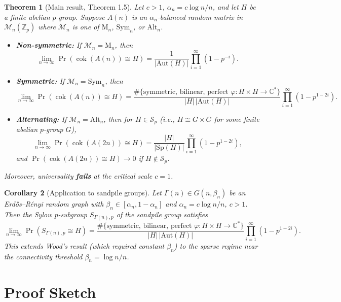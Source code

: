 \documentclass[11pt,a4paper]{article}
\newtheorem{theorem}{Theorem}
\newtheorem{corollary}[theorem]{Corollary}
\begin{document}
\begin{theorem}[Main result, Theorem 1.5]
Let $c > 1$, $\alpha_n = c\log n / n$, and let $H$ be a finite abelian $p$-group. Suppose $A(n)$ is an $\alpha_n$-balanced random matrix in $\mathcal{M}_n(\mathbb{Z}_p)$ where $\mathcal{M}_n$ is one of $\mathrm{M}_n$, $\mathrm{Sym}_n$, or $\mathrm{Alt}_n$.
\begin{itemize}
    \item \textbf{Non-symmetric:} If $\mathcal{M}_n = \mathrm{M}_n$, then
    \[
    \lim_{n\to\infty} \Pr(\operatorname{cok}(A(n)) \cong H) = \frac{1}{|\mathrm{Aut}(H)|}\prod_{i=1}^\infty (1-p^{-i}).
    \]
    \item \textbf{Symmetric:} If $\mathcal{M}_n = \mathrm{Sym}_n$, then
    \[
    \lim_{n\to\infty} \Pr(\operatorname{cok}(A(n)) \cong H) = \frac{\#\{\text{symmetric, bilinear, perfect } \varphi\colon H\times H \to \mathbb{C}^*\}}{|H|\,|\mathrm{Aut}(H)|}\prod_{i=1}^\infty (1-p^{1-2i}).
    \]
    \item \textbf{Alternating:} If $\mathcal{M}_n = \mathrm{Alt}_n$, then for $H \in \mathcal{S}_p$ (i.e., $H \cong G\times G$ for some finite abelian $p$-group $G$),
    \[
    \lim_{n\to\infty} \Pr(\operatorname{cok}(A(2n)) \cong H) = \frac{|H|}{|\mathrm{Sp}(H)|}\prod_{i=1}^\infty (1-p^{1-2i}),
    \]
    and $\Pr(\operatorname{cok}(A(2n)) \cong H) \to 0$ if $H \notin \mathcal{S}_p$.
\end{itemize}
Moreover, universality \textbf{fails} at the critical scale $c=1$.
\end{theorem}

\begin{corollary}[Application to sandpile groups]
Let $\Gamma(n) \in G(n,\beta_n)$ be an Erd\H{o}s--R\'enyi random graph with $\beta_n \in [\alpha_n, 1-\alpha_n]$ and $\alpha_n = c\log n / n$, $c>1$. Then the Sylow $p$-subgroup $S_{\Gamma(n),p}$ of the sandpile group satisfies
\[
\lim_{n\to\infty} \Pr(S_{\Gamma(n),p} \cong H) = \frac{\#\{\text{symmetric, bilinear, perfect } \varphi\colon H\times H\to \mathbb{C}^*\}}{|H|\,|\mathrm{Aut}(H)|}\prod_{i=1}^\infty (1-p^{1-2i}).
\]
This extends Wood's result (which required constant $\beta_n$) to the sparse regime near the connectivity threshold $\beta_n = \log n / n$.
\end{corollary}

\section{Proof Sketch}
\end{document}
